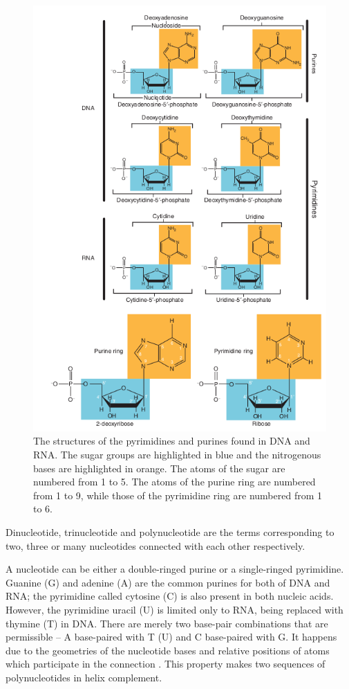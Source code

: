\begin{figure}[!ht]
	\centering
	\includegraphics[width=.85\textwidth]{figures/bases}
	\caption{The structures of the pyrimidines and purines found in DNA and RNA. The sugar groups are highlighted in blue and the nitrogenous bases are highlighted in orange. 
	The atoms of the sugar are numbered from 1 to 5. The atoms of the purine ring are numbered from 1 to 9, 
	while those of the pyrimidine ring are numbered from 1 to 6. \label{o:nucleotide}}
\end{figure}

Dinucleotide, trinucleotide and polynucleotide are the terms corresponding to two, three or many nucleotides connected with each other respectively.

A nucleotide can be either a double-ringed purine or a single-ringed pyrimidine. 
Guanine (G) and adenine (A) are the common purines for both of DNA and RNA; the pyrimidine called cytosine (C) is also present in both nucleic acids. 
However, the pyrimidine uracil (U) is limited only to RNA, being replaced with thymine (T) in DNA. 
There are merely two base-pair combinations that are permissible – A base-paired with T (U) and C base-paired with G. 
It happens due to the geometries of the nucleotide bases and relative positions of atoms which participate in the connection \cite{MolecularGenetics}.
This property makes two sequences of polynucleotides in helix complement. 

